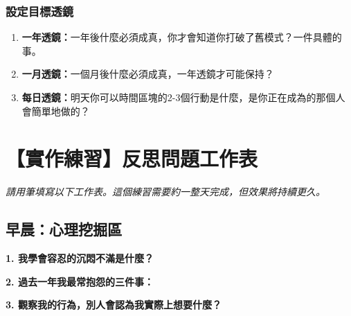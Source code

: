 \documentclass[12pt,a4paper]{article}
\begin{document}
\subsubsection{設定目標透鏡}

\begin{enumerate}
    \item \textbf{一年透鏡：}一年後什麼必須成真，你才會知道你打破了舊模式？一件具體的事。
    \item \textbf{一月透鏡：}一個月後什麼必須成真，一年透鏡才可能保持？
    \item \textbf{每日透鏡：}明天你可以時間區塊的2-3個行動是什麼，是你正在成為的那個人會簡單地做的？
\end{enumerate}

\section{【實作練習】反思問題工作表}

\textit{請用筆填寫以下工作表。這個練習需要約一整天完成，但效果將持續更久。}

\subsection{早晨：心理挖掘區}

\textbf{1. 我學會容忍的沉悶不滿是什麼？}
\begin{center}
\end{center}

\textbf{2. 過去一年我最常抱怨的三件事：}
\begin{center}
\end{center}

\textbf{3. 觀察我的行為，別人會認為我實際上想要什麼？}
\begin{center}
\end{center}
\end{document}
